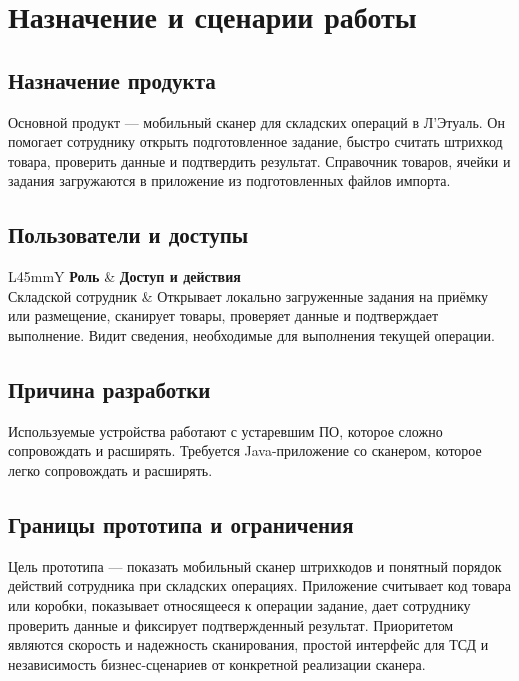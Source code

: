 \section{Назначение и сценарии работы}

\subsection{Назначение продукта}

Основной продукт --- мобильный сканер для складских операций в Л'Этуаль. Он помогает сотруднику открыть подготовленное задание, быстро считать штрихкод товара, проверить данные и подтвердить результат. Справочник товаров, ячейки и задания загружаются в приложение из подготовленных файлов импорта.

\subsection{Пользователи и доступы}

\begin{tabularx}{\textwidth}{L{45mm}Y}
\toprule
\textbf{Роль} & \textbf{Доступ и действия} \\
\midrule
Складской сотрудник & Открывает локально загруженные задания на приёмку или размещение, сканирует товары, проверяет данные и подтверждает выполнение. Видит сведения, необходимые для выполнения текущей операции. \\
\bottomrule
\end{tabularx}

\subsection{Причина разработки}

Используемые устройства работают с устаревшим ПО, которое сложно сопровождать и расширять. Требуется Java-приложение со сканером, которое легко сопровождать и расширять.

\subsection{Границы прототипа и ограничения}\label{scope:limitations}

Цель прототипа --- показать мобильный сканер штрихкодов и понятный порядок действий сотрудника при складских операциях. Приложение считывает код товара или коробки, показывает относящееся к операции задание, дает сотруднику проверить данные и фиксирует подтвержденный результат. Приоритетом являются скорость и надежность сканирования, простой интерфейс для ТСД и независимость бизнес-сценариев от конкретной реализации сканера.

